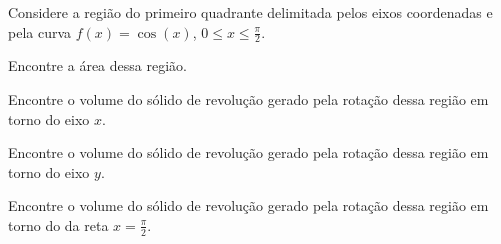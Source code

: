 \begin{exercises}
\begin{exercise}
  Considere a região do primeiro quadrante delimitada pelos eixos coordenadas
  e pela curva $f(x)=\cos(x)$, $0 \leq x \leq \frac{\pi}{2}$.
  \begin{alphalist}
    \item Encontre a área dessa região.
    \item Encontre o volume do sólido de revolução gerado pela rotação
    dessa região em torno do eixo $x$.
    \item Encontre o volume do sólido de revolução gerado pela rotação
    dessa região em torno do eixo $y$.
    \item Encontre o volume do sólido de revolução gerado pela rotação
      dessa região em torno do da reta \(x=\frac{\pi}{2}\).
  \end{alphalist}
\end{exercise}


\end{exercises}
